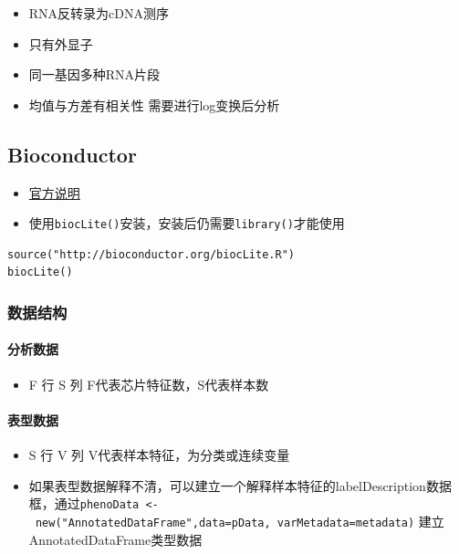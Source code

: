 \documentclass[]{book}
\providecommand{\tightlist}{%
  \setlength{\itemsep}{0pt}\setlength{\parskip}{0pt}}
\let\oldparagraph\paragraph
\renewcommand{\paragraph}[1]{\oldparagraph{#1}\mbox{}}
\begin{document}
\begin{itemize}
\tightlist
\item
  RNA反转录为cDNA测序
\item
  只有外显子
\item
  同一基因多种RNA片段
\item
  均值与方差有相关性 需要进行log变换后分析
\end{itemize}

\hypertarget{bioconductor}{%
\subsection{Bioconductor}\label{bioconductor}}

\begin{itemize}
\tightlist
\item
  \href{http://bioconductor.org/install/}{官方说明}
\item
  使用\texttt{biocLite()}安装，安装后仍需要\texttt{library()}才能使用
\end{itemize}

\begin{verbatim}
source("http://bioconductor.org/biocLite.R")
biocLite()
\end{verbatim}

\hypertarget{ux6570ux636eux7ed3ux6784-1}{%
\subsubsection{数据结构}\label{ux6570ux636eux7ed3ux6784-1}}

\hypertarget{ux5206ux6790ux6570ux636e}{%
\paragraph{分析数据}\label{ux5206ux6790ux6570ux636e}}

\begin{itemize}
\tightlist
\item
  F 行 S 列 F代表芯片特征数，S代表样本数
\end{itemize}

\hypertarget{ux8868ux578bux6570ux636e}{%
\paragraph{表型数据}\label{ux8868ux578bux6570ux636e}}

\begin{itemize}
\tightlist
\item
  S 行 V 列 V代表样本特征，为分类或连续变量
\item
  如果表型数据解释不清，可以建立一个解释样本特征的labelDescription数据框，通过\texttt{phenoData\ \textless{}-\ new("AnnotatedDataFrame",data=pData,\ varMetadata=metadata)} 建立AnnotatedDataFrame类型数据
\end{itemize}
\end{document}
